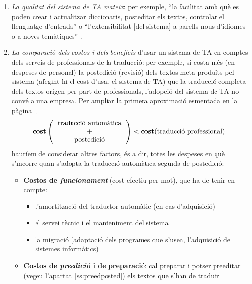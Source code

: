 \begin{enumerate}
\begin{enumerate}
D'altra banda, sempre s'ha de tenir en compte que els mètodes
d'avaluació de la qualitat depenen de l'ús que es pensa donar al
sistema de TA \citep{arnold93j}; per exemple, l'avaluació d'un sistema
que s'usa per a la \emph{disseminació} de material és ben diferent de
l'avaluació d'un sistema usat per a l'\emph{assimilació}
d'informació.\footnote{De nou, com s'ha discutit en el capítol~\ref{se:TiTA}, la
  noció central és la de \emph{propòsit} de la traducció.}

\item \emph{La qualitat del sistema de TA mateix}: per exemple, ``la facilitat amb
  què es poden crear i actualitzar diccionaris, posteditar els
  textos, controlar el llenguatge d'entrada'' o
  ``l'extensibilitat [del sistema] a parells nous d'idiomes o a noves temàtiques''
  \citep{hutchins96u}.
\item \label{pg:costdetall}
\emph{La comparació dels costos i dels beneficis} d'usar un
  sistema de TA en comptes dels serveis de professionals de la
  traducció: per exemple, si costa més (en despeses de personal) la
  postedició (revisió) dels textos meta produïts pel sistema
  (afegint-hi el cost d'usar el sistema de TA) que la traducció
  completa dels textos origen per part de professionals, l'adopció del
  sistema de TA no convé a una empresa. Per ampliar la primera
  aproximació esmentada en la pàgina~\pageref{pg:cost},
$$\textbf{cost}\left(\mbox{\begin{tabular}{c}traducció automàtica\\ +\\
      postedició\end{tabular}}\right) <
\textbf{cost}(\mbox{traducció professional}).
$$
hauríem de considerar altres factors, és a dir, totes les despeses en
què s'incorre quan s'adopta la traducció automàtica seguida de
postedició:
  \begin{itemize}
  \item \textbf{Costos de \emph{funcionament}} (cost efectiu per mot),
    que ha de tenir en compte:
    \begin{itemize}
    \item l'amortització del traductor automàtic (en cas d'adquisició)
    \item el servei tècnic i el manteniment del sistema
    \item la migració (adaptació dels programes que s'usen,
      l'adquisició de sistemes informàtics)
    \end{itemize}

  \item \textbf{Costos de \emph{preedició} i de preparació}: cal
    preparar i potser preeditar (vegeu l'apartat~\ref{ss:preedposted})
    els textos que s'han de traduir


\end{itemize}
\end{enumerate}
\end{enumerate}
